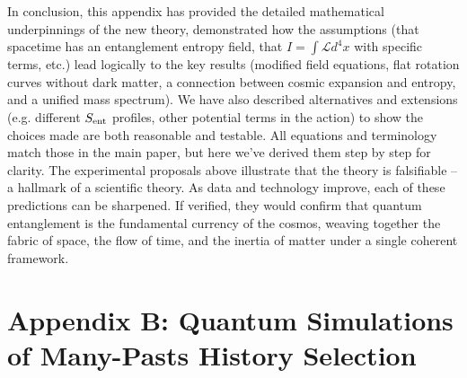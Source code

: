\documentclass[11pt]{article}
\begin{document}
In conclusion, this appendix has provided the detailed mathematical underpinnings of the new theory, demonstrated how the assumptions (that spacetime has an entanglement entropy field, that $I = \int \mathcal{L} d^4x$ with specific terms, etc.) lead logically to the key results (modified field equations, flat rotation curves without dark matter, a connection between cosmic expansion and entropy, and a unified mass spectrum). We have also described alternatives and extensions (e.g. different $S_{\rm ent}$ profiles, other potential terms in the action) to show the choices made are both reasonable and testable. All equations and terminology match those in the main paper, but here we’ve derived them step by step for clarity. The experimental proposals above illustrate that the theory is falsifiable – a hallmark of a scientific theory. As data and technology improve, each of these predictions can be sharpened. If verified, they would confirm that quantum entanglement is the fundamental currency of the cosmos, weaving together the fabric of space, the flow of time, and the inertia of matter under a single coherent framework.

\section*{Appendix B: Quantum Simulations of Many-Pasts History Selection} %
\end{document}
